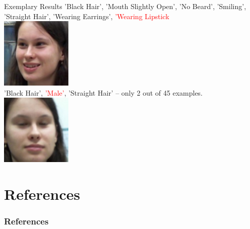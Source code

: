 \documentclass{beamer}
\begin{document}
\begin{frame}{Exemplary Results}
'Black Hair', 'Mouth Slightly Open', 'No Beard', 'Smiling', 'Straight Hair', 'Wearing Earrings', \textcolor{red}{'Wearing Lipstick}
 \\
 \centering
\includegraphics[height=0.3\textheight]{figures/leti_normalised24}\\
'Black Hair', \textcolor{red}{'Male'}, 'Straight Hair' -- only 2 out of 45 examples. \\
\includegraphics[height=0.3\textheight]{figures/leti_normalised0}
\end{frame}



\section{References}
\begin{frame}
	\frametitle{References}
	\footnotesize
	
\end{frame}
\end{document}

